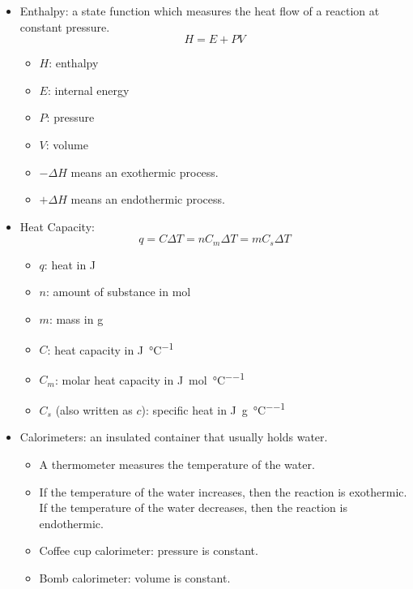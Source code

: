\documentclass{article}
\begin{document}
\begin{itemize}
    \item Enthalpy: a state function which measures the heat flow of a reaction at constant pressure.
    \begin{equation*}
        H = E + PV
    \end{equation*}
    \begin{itemize}
        \item $H$: enthalpy
        \item $E$: internal energy
        \item $P$: pressure
        \item $V$: volume    
        \item $-\Delta H$ means an exothermic process.
        \item $+\Delta H$ means an endothermic process.
    \end{itemize}
    \item Heat Capacity:
    \begin{equation*}
        q = C \Delta T = n C_m \Delta T = m C_s \Delta T
    \end{equation*}
    \begin{itemize}
        \item $q$: heat in \si{\joule}
        \item $n$: amount of substance in \si{\mole}
        \item $m$: mass in \si{\gram}
        \item $C$: heat capacity in \si[per-mode = fraction]{\joule\per\celsius}
        \item $C_m$: molar heat capacity in \si[per-mode = fraction]{\joule\per\mole\per\celsius}
        \item $C_s$ (also written as $c$): specific heat in \si[per-mode = fraction]{\joule\per\gram\per\celsius} 
    \end{itemize}
    \item Calorimeters: an insulated container that usually holds water. 
    \begin{itemize}
        \item A thermometer measures the temperature of the water. 
        \item If the temperature of the water increases, then the reaction is exothermic. If the temperature of the water decreases, then the reaction is endothermic.
        \item Coffee cup calorimeter: pressure is constant.
        \item Bomb calorimeter: volume is constant.

\end{itemize}
\end{itemize}
\end{document}
